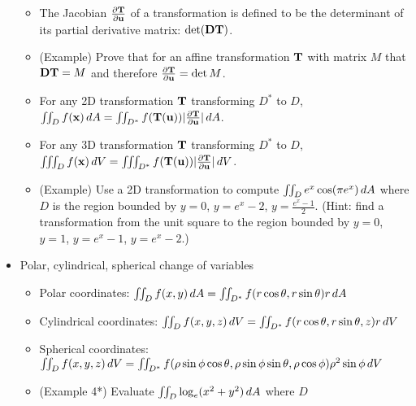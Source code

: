 \documentclass[11pt]{article}
\begin{document}
\begin{itemize}
\begin{itemize}
      \item The Jacobian \(\frac{\partial \mathbf{T}}{\partial \mathbf{u}}\) of a transformation
            is defined to be the determinant of its partial derivative matrix:
            \(\det(\mathbf{D}\mathbf{T})\).
      \item (Example) Prove that for an affine transformation \(\mathbf{T}\) with
            matrix \(M\) that \(\mathbf{D}\mathbf{T}=M\) and therefore
            \(\frac{\partial\mathbf{T}}{\partial\mathbf{u}}=\det M\).
      \item For any 2D transformation \(\mathbf{T}\)
            transforming \(D^*\) to \(D\),
            \(
              \iint_D f(\mathbf{x})\,d A
                =
              \iint_{D^*}f(\mathbf{T}(\mathbf{u}))|\frac{\partial\mathbf{T}}{\partial\mathbf{u}}|\,d A
            \).
      \item For any 3D transformation \(\mathbf{T}\)
            transforming \(D^*\) to \(D\),
            \(
              \iiint_D f(\mathbf{x})\,d V
                =
              \iiint_{D^*}f(\mathbf{T}(\mathbf{u}))|\frac{\partial\mathbf{T}}{\partial\mathbf{u}}|\,d V
            \).
      \item (Example) Use a 2D transformation to compute
            \(\iint_D e^x\cos(\pi e^x)\,d{A}\) where
            \(D\) is the region
            bounded by \(y=0\), \(y=e^x-2\), \(y=\frac{e^x-1}{2}\).
            (Hint: find a transformation from the unit square to the
            region bounded by \(y=0\),
            \(y=1\), \(y=e^x-1\), \(y=e^x-2\).)
    \end{itemize}
  \item Polar, cylindrical, spherical change of variables
    \begin{itemize}
      \item Polar coordinates:
            \(
              \iint_D f(x,y)\,d A
                =
              \iint_{D^*}f(r\cos\theta,r\sin\theta)r\,d A
            \)
      \item Cylindrical coordinates:
            \(
              \iint_D f(x,y,z)\,d V
                =
              \iint_{D^*}f(r\cos\theta,r\sin\theta,z)r\,d V
            \)
      \item Spherical coordinates:
            \(
              \iint_D f(x,y,z)\,d V
                =
              \iint_{D^*} f(
                \rho\sin\phi\cos\theta,
                \rho\sin\phi\sin\theta,
                \rho\cos\phi
              )\rho^2\sin\phi\,d V
            \)
      \item (Example 4*) Evaluate \(\iint_D\log_e(x^2+y^2)\,d A\) where \(D\)

\end{itemize}
\end{itemize}
\end{document}
